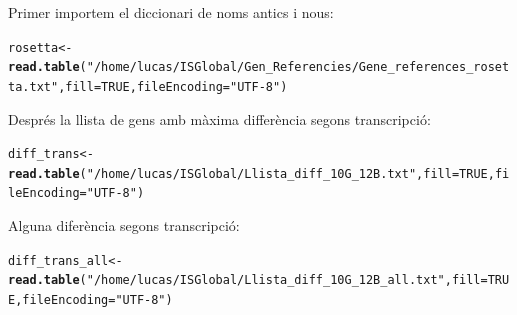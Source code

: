 \documentclass[12pt, a4paper]{article}\usepackage[]{graphicx}\usepackage[]{color}
\makeatletter
\newcommand{\hlnum}[1]{\textcolor[rgb]{0.686,0.059,0.569}{#1}}%
\newcommand{\hlstr}[1]{\textcolor[rgb]{0.192,0.494,0.8}{#1}}%
\newcommand{\hlstd}[1]{\textcolor[rgb]{0.345,0.345,0.345}{#1}}%
\newcommand{\hlkwb}[1]{\textcolor[rgb]{0.69,0.353,0.396}{#1}}%
\newcommand{\hlkwc}[1]{\textcolor[rgb]{0.333,0.667,0.333}{#1}}%
\newcommand{\hlkwd}[1]{\textcolor[rgb]{0.737,0.353,0.396}{\textbf{#1}}}%
\newenvironment{kframe}{%
 \def\at@end@of@kframe{}%
 \ifinner\ifhmode%
  \def\at@end@of@kframe{\end{minipage}}%
  \begin{minipage}{\columnwidth}%
 \fi\fi%
 \def\FrameCommand##1{\hskip\@totalleftmargin \hskip-\fboxsep
 \colorbox{shadecolor}{##1}\hskip-\fboxsep
     \hskip-\linewidth \hskip-\@totalleftmargin \hskip\columnwidth}%
 \MakeFramed {\advance\hsize-\width
   \@totalleftmargin\z@ \linewidth\hsize
   \@setminipage}}%
 {\par\unskip\endMakeFramed%
 \at@end@of@kframe}
\newenvironment{knitrout}{}{} %
\makeatother
\begin{document}
Primer importem el diccionari de noms antics i nous:
\begin{knitrout}
\color{fgcolor}\begin{kframe}
\begin{alltt}
\hlstd{rosetta} \hlkwb{<-} \hlkwd{read.table}\hlstd{(}\hlstr{"/home/lucas/ISGlobal/Gen_Referencies/Gene_references_rosetta.txt"}\hlstd{,} \hlkwc{fill} \hlstd{=} \hlnum{TRUE}\hlstd{,} \hlkwc{fileEncoding} \hlstd{=} \hlstr{"UTF-8"}\hlstd{)}
\end{alltt}
\end{kframe}
\end{knitrout}
Després la llista de gens amb màxima differència segons transcripció:
\begin{knitrout}
\color{fgcolor}\begin{kframe}
\begin{alltt}
\hlstd{diff_trans} \hlkwb{<-} \hlkwd{read.table}\hlstd{(}\hlstr{"/home/lucas/ISGlobal/Llista_diff_10G_12B.txt"}\hlstd{,} \hlkwc{fill} \hlstd{=} \hlnum{TRUE}\hlstd{,} \hlkwc{fileEncoding} \hlstd{=} \hlstr{"UTF-8"}\hlstd{)}
\end{alltt}


{\ttfamily\noindent{}}

{\ttfamily\noindent\bfseries{}}\end{kframe}
\end{knitrout}
Alguna diferència segons transcripció:
\begin{knitrout}
\color{fgcolor}\begin{kframe}
\begin{alltt}
\hlstd{diff_trans_all} \hlkwb{<-} \hlkwd{read.table}\hlstd{(}\hlstr{"/home/lucas/ISGlobal/Llista_diff_10G_12B_all.txt"}\hlstd{,} \hlkwc{fill} \hlstd{=} \hlnum{TRUE}\hlstd{,} \hlkwc{fileEncoding} \hlstd{=} \hlstr{"UTF-8"}\hlstd{)}
\end{alltt}


{\ttfamily\noindent{}}

{\ttfamily\noindent\bfseries{}}\end{kframe}
\end{knitrout}
\end{document}
